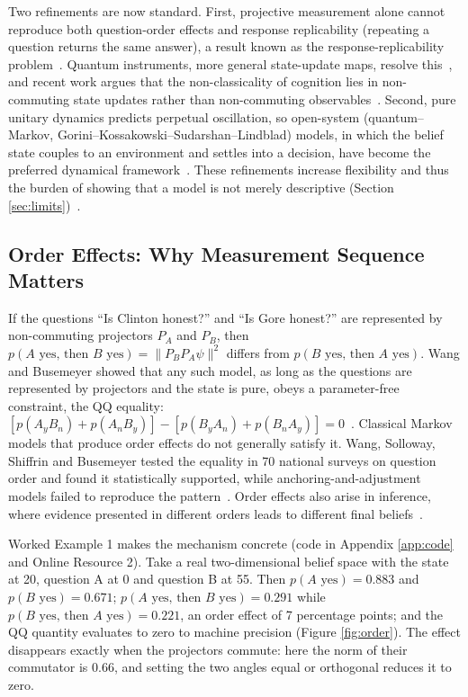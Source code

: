 \documentclass[pdflatex,sn-basic]{sn-jnl}
\begin{document}
Two refinements are now standard. First, projective measurement alone cannot reproduce both question-order effects and response replicability (repeating a question returns the same answer), a result known as the response-replicability problem~\citep{Khrennikov2014}. Quantum instruments, more general state-update maps, resolve this~\citep{Ozawa2020,Ozawa2021}, and recent work argues that the non-classicality of cognition lies in non-commuting state updates rather than non-commuting observables~\citep{Fuyama2025,Busemeyer2025}. Second, pure unitary dynamics predicts perpetual oscillation, so open-system (quantum--Markov, Gorini--Kossakowski--Sudarshan--Lindblad) models, in which the belief state couples to an environment and settles into a decision, have become the preferred dynamical framework~\citep{Busemeyer2020,Khrennikov2023a,Asano2026}. These refinements increase flexibility and thus the burden of showing that a model is not merely descriptive (Section \ref{sec:limits})~\citep{Broekaert2017}.

\subsection{Order Effects: Why Measurement Sequence Matters}\label{sec:order}
If the questions ``Is Clinton honest?'' and ``Is Gore honest?'' are represented by non-commuting projectors $P_A$ and $P_B$, then $p(A\text{ yes, then }B\text{ yes}) = \lVert P_B P_A \psi\rVert^2$ differs from $p(B\text{ yes, then }A\text{ yes})$. Wang and Busemeyer showed that any such model, as long as the questions are represented by projectors and the state is pure, obeys a parameter-free constraint, the QQ equality: $[p(A_yB_n) + p(A_nB_y)] - [p(B_yA_n) + p(B_nA_y)] = 0$~\citep{Wang2013b}. Classical Markov models that produce order effects do not generally satisfy it. Wang, Solloway, Shiffrin and Busemeyer tested the equality in 70 national surveys on question order and found it statistically supported, while anchoring-and-adjustment models failed to reproduce the pattern~\citep{Wang2014}. Order effects also arise in inference, where evidence presented in different orders leads to different final beliefs~\citep{Trueblood2011,Trueblood2017a}.

Worked Example 1 makes the mechanism concrete (code in Appendix \ref{app:code} and Online Resource 2). Take a real two-dimensional belief space with the state at 20\textdegree{}, question A at 0\textdegree{} and question B at 55\textdegree{}. Then $p(A\text{ yes}) = 0.883$ and $p(B\text{ yes}) = 0.671$; $p(A\text{ yes, then }B\text{ yes}) = 0.291$ while $p(B\text{ yes, then }A\text{ yes}) = 0.221$, an order effect of 7 percentage points; and the QQ quantity evaluates to zero to machine precision (Figure \ref{fig:order}). The effect disappears exactly when the projectors commute: here the norm of their commutator is 0.66, and setting the two angles equal or orthogonal reduces it to zero.
\end{document}
